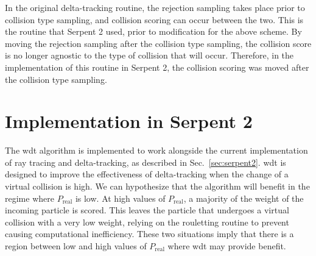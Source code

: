 In the original delta-tracking routine, the rejection sampling takes
place prior to collision type sampling, and collision scoring can
occur between the two. This is the routine that Serpent 2 used, prior
to modification for the above scheme. By moving the rejection sampling
after the collision type sampling, the collision score is no longer
agnostic to the type of collision that will occur. Therefore, in the
implementation of this routine in Serpent 2, the collision scoring was
moved after the collision type sampling.

\section{Implementation in Serpent 2}
\label{sec:method_implementation}

The \gls{wdt} algorithm is implemented to work alongside the current
implementation of ray tracing and delta-tracking, as described in
Sec.~\ref{sec:serpent2}. \gls{wdt} is designed to improve the
effectiveness of delta-tracking when the change of a virtual collision
is high. We can hypothesize that the algorithm will benefit in the
regime where $P_{\mathrm{real}}$ is low. At high values of
$P_{\mathrm{real}}$, a majority of the weight of the incoming particle
is scored. This leaves the particle that undergoes a virtual collision
with a very low weight, relying on the rouletting routine to prevent
causing computational inefficiency. These two situations imply that
there is a region between low and high values of $P_\mathrm{real}$
where \gls{wdt} may provide benefit.


